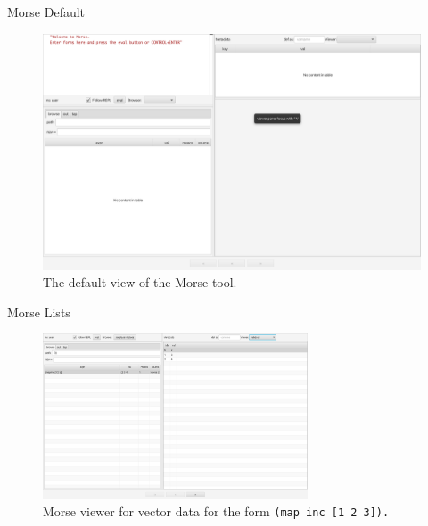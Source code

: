 \documentclass{beamer}
\begin{document}
\begin{frame}{Morse Default}
  \begin{figure}
    \centering
    \includegraphics[height=0.7\textheight]{../resources/MorseDefault.jpg}
    \caption{The default view of the Morse tool.}
    \label{fig:defaultMorse}
  \end{figure}
\end{frame}

\begin{frame}{Morse Lists}
  \begin{figure}
    \centering
    \includegraphics[width=0.7\textwidth]{../resources/MorseSuccessfulForm.png}
    \caption{Morse viewer for vector data for the form \texttt{(map inc [1 2 3]).}}
    \label{fig:MorseVec}
  \end{figure}
\end{frame}
\end{document}
